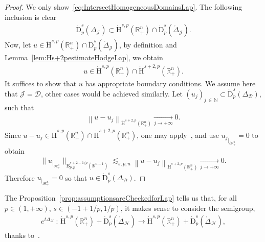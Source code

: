 \documentclass[AHL,Unicode,longabstracts,published]{cedram}
\newcommand{\bbR}{\mathbb{R}}
\newcommand{\bbN}{\mathbb{N}}
\newcommand{\rmH}{\mathrm{H}}%
\newcommand{\rmB}{\mathrm{B}}
\newcommand{\rmD}{\mathrm{D}}
\newcommand{\clH}{\mathcal{H}}
\newcommand{\clJ}{\mathcal{J}}
\newcommand{\clD}{\mathcal{D}}
\begin{document}
\begin{proof}
We only show~\eqref{eq:IntersectHomogeneousDomainsLap}. The following inclusion is clear
\begin{align*}
\dot{\rmD}^{s}_{p}({\Delta}_\clJ) \subset\dot{\rmH}^{s,p}\left(\bbR^n_+\right)\cap\dot{\rmD}^{s}_{p}\left(\mathring{\Delta}_\clJ\right) .
\end{align*}
Now, let $u\in \dot{\rmH}^{s,p}(\bbR^n_+)\cap\dot{\rmD}^{s}_{p}(\mathring{\Delta}_\clJ)$, by definition and Lemma~\ref{lem:Hs+2pestimateHodgeLap}, we obtain
\begin{align*}
u\in \dot{\rmH}^{s,p}\left(\bbR^n_+\right)\cap\dot{\rmH}^{s+2,p}\left(\bbR^n_+\right) .
\end{align*}
It suffices to show that $u$ has appropriate boundary conditions. We assume here that $\clJ=\clD$, other cases would be achieved similarly. Let $(u_j)_{j\,\in\,\bbN}\subset\dot{\rmD}^{s}_{p}(\Delta_\clD)$, such that
\begin{align*}
\left\| u-u_j \right\|_{\dot{\rmH}^{s+2,p}\left(\bbR^n_+\right)} \xrightarrow[j\rightarrow +\infty]{} 0 .
\end{align*}
Since $u-u_j\in \dot{\rmH}^{s,p}(\bbR^n_+)\cap\dot{\rmH}^{s+2,p}(\bbR^n_+)$, one may apply~\cite[Proposition~4.6]{Gaudin2022}, and use ${u_j}_{|_{\partial\bbR^n_+}}=0$ to obtain
\begin{align*}
\big\| u_{|_{\partial\bbR^n_+}}\big\|_{\dot{\rmB}^{s+2-{1/p}}_{p,p}\left(\bbR^{n-1}\right)}\lesssim_{s,p,n}\left\| u-u_j \right\|_{\dot{\rmH}^{s+2,p}\left(\bbR^n_+\right)} \xrightarrow[j\rightarrow +\infty]{} 0.
\end{align*}
Therefore $u_{|_{\partial\bbR^n_+}}=0$ so that $u\in\dot{\rmD}^{s}_{p}({\Delta}_\clD)$.
\end{proof}


The Proposition~\ref{prop:assumptionsareCheckedforLap} tells us that, for all $p\in(1,+\infty)$, $s\in(-1+1/p,1/p)$, it makes sense to consider the semigroup,
\begin{align*}
e^{t\Delta_\clH}\,:\,\dot{\rmH}^{s,p}\left(\bbR^n_+\right)+\dot{\rmD}^{s}_{p}\left(\mathring{\Delta}_\clH\right)\longrightarrow\dot{\rmH}^{s,p}\left(\bbR^n_+\right)+\dot{\rmD}^{s}_{p}\left(\mathring{\Delta}_\clH\right),
\end{align*}
thanks to~\cite[Chapter~2,~Section~1]{DanchinHieberMuchaTolk2020}.
\end{document}
